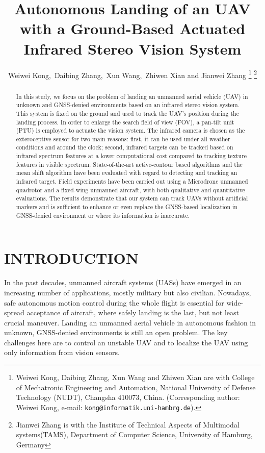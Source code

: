 \documentclass[letterpaper, 10 pt, conference]{ieeeconf}  %
\title{\LARGE \bf
Autonomous Landing of an UAV with a Ground-Based Actuated Infrared Stereo Vision System}
\author{Weiwei Kong,\ Daibing Zhang,\ Xun Wang,\ Zhiwen Xian and Jianwei Zhang%
\thanks{Weiwei Kong, Daibing Zhang, Xun Wang and Zhiwen Xian are with College of Mechatronic Engineering and Automation, National University of Defense Technology (NUDT), Changsha 410073, China. (Corresponding author: Weiwei Kong, e-mail:  {\tt\small kong@informatik.uni-hambrg.de}).
       }%
\thanks{Jianwei Zhang is with the Institute of Technical Aspects of Multimodal systems(TAMS), Department of Computer Science, University of Hamburg, Germany}%
}
\begin{document}
\maketitle
\thispagestyle{empty}
\pagestyle{empty}

\begin{abstract}

In this study, we focus on the problem of landing an unmanned aerial vehicle (UAV) in unknown and GNSS-denied environments based on an infrared stereo vision system. This system is fixed on the ground and used to track the UAV's position during the landing process. In order to enlarge the search field of view (FOV), a pan-tilt unit (PTU) is employed to actuate the vision system. The infrared camera is chosen as the exteroceptive sensor for two main reasons: first, it can be used under all weather conditions and around the clock; second, infrared targets can be tracked based on infrared spectrum features at a lower computational cost compared to tracking texture features in visible spectrum. State-of-the-art active-contour based algorithms and the mean shift algorithm have been evaluated with regard to detecting and tracking an infrared target. Field experiments have been carried out using a Microdrone unmanned quadrotor and a fixed-wing unmanned aircraft, with both qualitative and quantitative evaluations. The results demonstrate that our system can track UAVs without artificial markers and is sufficient to enhance or even replace the GNSS-based localization in GNSS-denied environment or where its information is inaccurate.

\end{abstract}


\section{INTRODUCTION}

In the past decades, unmanned aircraft systems (UASs) have emerged in an increasing number of applications, mostly military but also civilian. Nowadays, safe autonomous motion control during the whole flight is essential for wide-spread acceptance of aircraft, where safely landing is the last, but not least crucial maneuver. Landing an unmanned aerial vehicle in autonomous fashion in unknown, GNSS-denied environments is still an open problem. The key challenges here are to control an unstable UAV and to localize the UAV using only information from vision sensors.
\end{document}
